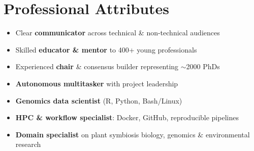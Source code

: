 \documentclass[a4paper,10pt]{article}
\begin{document}
{\begin{adjustbox}{valign=t}
\begin{minipage}[t]{0.3\textwidth}
{\section*{Professional Attributes}
\begin{spacing}{1}
\begin{itemize}
  \setlength{\itemindent}{-1em}
  \setlength{\itemsep}{0.0em}
  \item Clear \textbf{communicator} across technical \& non-technical audiences
  \item Skilled \textbf{educator \& mentor} to 400+ young professionals
  \item Experienced \textbf{chair} \& consensus builder representing $\sim$2000 PhDs
  \item \textbf{Autonomous multitasker} with project leadership
  \item \textbf{Genomics data scientist} (R, Python, Bash/Linux)
  \item \textbf{HPC \& workflow specialist}: Docker, GitHub, reproducible pipelines
  \item \textbf{Domain specialist} on plant symbiosis biology, genomics \& environmental research 
\end{itemize}
\end{spacing}
}


\end{minipage}%
\end{adjustbox}%
\hfill%


\begin{adjustbox}{valign=t}
\hfill%
\begin{minipage}[t]{0.05\textwidth}
\MyVerticalRule
\end{minipage}%
\end{adjustbox}

\begin{adjustbox}{valign=t}
\hfill%
\begin{minipage}[t]{0.6\textwidth}



\end{minipage}
\end{adjustbox}}
\end{document}
